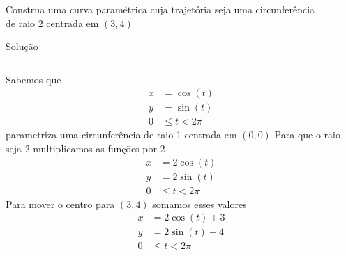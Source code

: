 \begin{question}
  Construa uma curva paramétrica cuja trajetória seja uma circunferência\\
  de raio 2 centrada em $(3, 4)$
\end{question}

\begin{resolution}{Solução}
\begin{columns}[t]
  Sabemos que
  \begin{align*}
    x & = \cos(t) \\
    y & = \sin(t) \\
    0 & \leq t < 2\pi
  \end{align*}
  parametriza uma circunferência de raio 1 centrada em \((0, 0)\)
  \pause
  Para que o raio seja 2 multiplicamos as funções por 2
  \begin{align*}
    x & = 2\cos(t) \\
    y & = 2\sin(t) \\
    0 & \leq t < 2\pi
  \end{align*}
  \pause
  Para mover o centro para $(3, 4)$ somamos esses valores
  \begin{align*}
    x & = 2\cos(t) + 3\\
    y & = 2\sin(t) + 4\\
    0 & \leq t < 2\pi
  \end{align*}
\end{columns}
\end{resolution}

